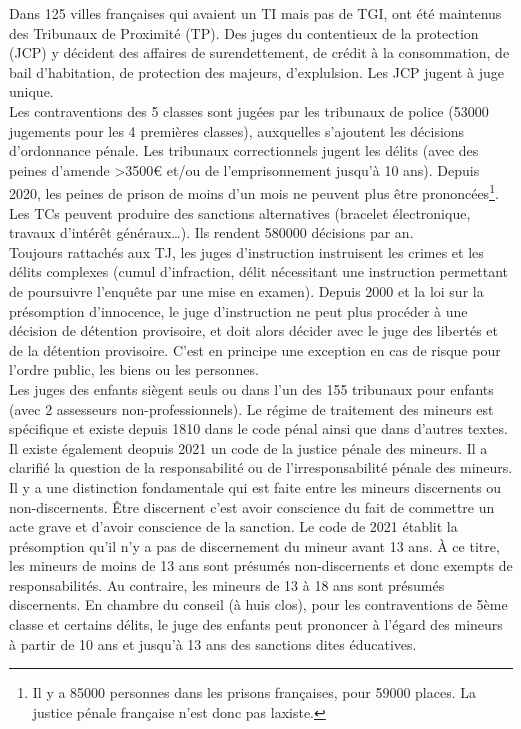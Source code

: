 \documentclass[math]{cours}
\begin{document}
	Dans 125 villes françaises qui avaient un TI mais pas de TGI, ont été maintenus des Tribunaux de Proximité (TP).
	Des juges du contentieux de la protection (JCP) y décident des affaires de surendettement, de crédit à la consommation, de bail d'habitation, de protection des majeurs, d'explulsion.
	Les JCP jugent à juge unique.\\
	Les contraventions des 5 classes sont jugées par les tribunaux de police (53000 jugements pour les 4 premières classes), auxquelles s'ajoutent les décisions d'ordonnance pénale.
	Les tribunaux correctionnels jugent les délits (avec des peines d'amende >3500€ et/ou de l'emprisonnement jusqu'à 10 ans).
	Depuis 2020, les peines de prison de moins d'un mois ne peuvent plus être prononcées\footnote{Il y a 85000 personnes dans les prisons françaises, pour 59000 places. La justice pénale française n'est donc pas laxiste.}.
	Les TCs peuvent produire des sanctions alternatives (bracelet électronique, travaux d'intérêt généraux\ldots). Ils rendent 580000 décisions par an.\\
	Toujours rattachés aux TJ, les juges d'instruction instruisent les crimes et les délits complexes (cumul d'infraction, délit nécessitant une instruction permettant de poursuivre l'enquête par une mise en examen).
	Depuis 2000 et la loi sur la présomption d'innocence, le juge d'instruction ne peut plus procéder à une décision de détention provisoire, et doit alors décider avec le juge des libertés et de la détention provisoire.
	C'est en principe une exception en cas de risque pour l'ordre public, les biens ou les personnes.\\
	Les juges des enfants siègent seuls ou dans l'un des 155 tribunaux pour enfants (avec 2 assesseurs non-professionnels).
	Le régime de traitement des mineurs est spécifique et existe depuis 1810 dans le code pénal ainsi que dans d'autres textes.
	Il existe également deopuis 2021 un code de la justice pénale des mineurs.
	Il a clarifié la question de la responsabilité ou de l'irresponsabilité pénale des mineurs.
	Il y a une distinction fondamentale qui est faite entre les mineurs discernents ou non-discernents.
	Être discernent c'est avoir conscience du fait de commettre un acte grave et d'avoir conscience de la sanction.
	Le code de 2021 établit la présomption qu'il n'y a pas de discernement du mineur avant 13 ans.
	À ce titre, les mineurs de moins de 13 ans sont présumés non-discernents et donc exempts de responsabilités.
	Au contraire, les mineurs de 13 à 18 ans sont présumés discernents.
	En chambre du conseil (à huis clos), pour les contraventions de 5ème classe et certains délits, le juge des enfants peut prononcer à l'égard des mineurs à partir de 10 ans et jusqu'à 13 ans des sanctions dites éducatives.
\end{document}
